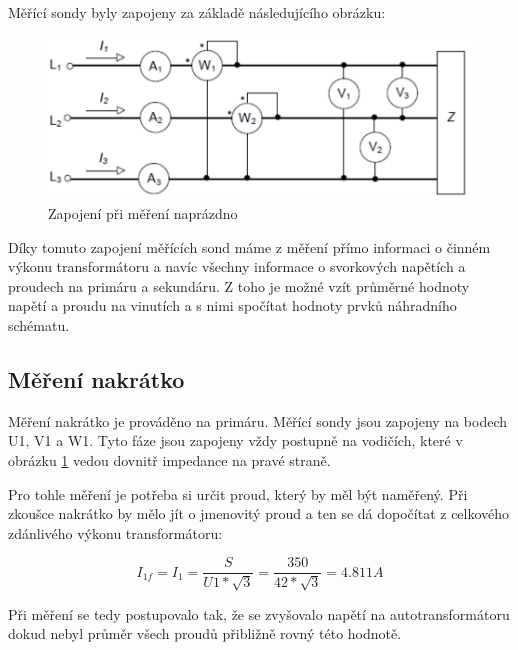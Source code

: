 \documentclass{protokol}
\begin{document}
Měřící sondy byly zapojeny za základě následujícího obrázku:

\begin{figure}[H]
    \centering
    \includegraphics[width=0.5\linewidth]{ZapojeniMeraku.png}
    \caption{Zapojení při měření naprázdno}
    \label{fig:ZapojeniMeraku}
\end{figure}

Díky tomuto zapojení měřících sond máme z měření přímo informaci o činném výkonu transformátoru a navíc všechny informace o svorkových napětích a proudech na primáru a sekundáru. Z toho je možné vzít průměrné hodnoty napětí a proudu na vinutích a s nimi spočítat hodnoty prvků náhradního schématu.

\subsection{Měření nakrátko}
Měření nakrátko je prováděno na primáru. Měřící sondy jsou zapojeny na bodech U1, V1 a W1. Tyto fáze jsou zapojeny vždy postupně na vodičích, které v obrázku \ref{fig:ZapojeniMeraku} vedou dovnitř impedance na pravé straně.

Pro tohle měření je potřeba si určit proud, který by měl být naměřený. Při zkoušce nakrátko by mělo jít o jmenovitý proud a ten se dá dopočítat z celkového zdánlivého výkonu transformátoru:

\begin{equation}
    I_{1f} = I_{1} = \frac{S}{U1*\sqrt{3}} = \frac{350}{42*\sqrt{3}} = 4.811 A
    \label{eq:VypocetProuduZVykonu}
\end{equation}

Při měření se tedy postupovalo tak, že se zvyšovalo napětí na autotransformátoru dokud nebyl průměr všech proudů přibližně rovný této hodnotě. 
\end{document}
